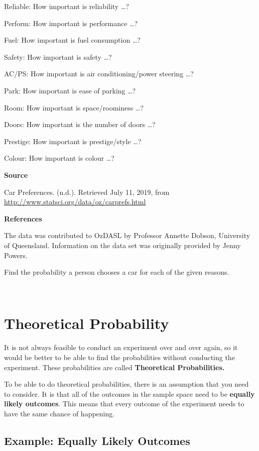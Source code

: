 \documentclass[
]{book}
\begin{document}
Reliable: How important is reliability \ldots?

Perform: How important is performance \ldots?

Fuel: How important is fuel consumption \ldots?

Safety: How important is safety \ldots?

AC/PS: How important is air conditioning/power steering \ldots?

Park: How important is ease of parking \ldots?

Room: How important is space/roominess \ldots?

Doors: How important is the number of doors \ldots?

Prestige: How important is prestige/style \ldots?

Colour: How important is colour \ldots?

\textbf{Source}

Car Preferences. (n.d.). Retrieved July 11, 2019, from \url{http://www.statsci.org/data/oz/carprefs.html}

\textbf{References}

The data was contributed to OzDASL by Professor Annette Dobson, University of Queensland. Information on the data set was originally provided by Jenny Powers.

Find the probability a person chooses a car for each of the given reasons.

\textbf{\\
}

\hypertarget{theoretical-probability}{%
\section{Theoretical Probability}\label{theoretical-probability}}

It is not always feasible to conduct an experiment over and over again, so it would be better to be able to find the probabilities without conducting the experiment. These probabilities are called \textbf{Theoretical Probabilities.}

To be able to do theoretical probabilities, there is an assumption that you need to consider. It is that all of the outcomes in the sample space need to be \textbf{equally likely outcomes}. This means that every outcome of the experiment needs to have the same chance of happening.

\hypertarget{example-equally-likely-outcomes}{%
\subsection{Example: Equally Likely Outcomes}\label{example-equally-likely-outcomes}}
\end{document}
